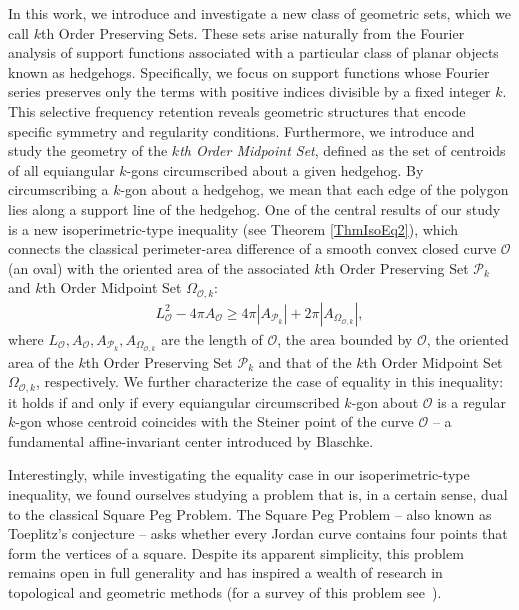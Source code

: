 \documentclass{amsart}
\theoremstyle{definition}
\numberwithin{equation}{section}
\begin{document}
In this work, we introduce and investigate a new class of geometric sets, which we call $k$th Order Preserving Sets. These sets arise naturally from the Fourier analysis of support functions associated with a particular class of planar objects known as hedgehogs. Specifically, we focus on support functions whose Fourier series preserves only the terms with positive indices divisible by a fixed integer $k$. This selective frequency retention reveals geometric structures that encode specific symmetry and regularity conditions. Furthermore, we introduce and study the geometry of the \textit{$k$th Order Midpoint Set}, defined as the set of centroids of all equiangular $k$-gons circumscribed about a given hedgehog. By circumscribing a $k$-gon about a hedgehog, we mean that each edge of the polygon lies along a support line of the hedgehog.
One of the central results of our study is a new isoperimetric-type inequality (see Theorem \ref{ThmIsoEq2}), which connects the classical perimeter-area difference of a smooth convex closed curve $\mathcal{O}$ (an oval) with the oriented area of the associated $k$th Order Preserving Set $\mathcal{P}_k$ and $k$th Order Midpoint Set $\Omega_{\mathcal{O},k}$:
\begin{align*}
L_{\mathcal{O}}^2 - 4\pi A_{\mathcal{O}} \geqslant  4\pi |A_{\mathcal{P}_k}| + 2\pi |A_{\Omega_{\mathcal{O},k}}|,
\end{align*}
where $L_{\mathcal{O}}, A_{\mathcal{O}}, A_{\mathcal{P}_k}, A_{\Omega_{\mathcal{O},k}}$ are the length of $\mathcal{O}$, the area bounded by $\mathcal{O}$, the oriented area of the $k$th Order Preserving Set $\mathcal{P}_k$ and that of the $k$th Order Midpoint Set $\Omega_{\mathcal{O},k}$, respectively. We further characterize the case of equality in this inequality: it holds if and only if every equiangular circumscribed $k$-gon about $\mathcal{O}$ is a regular \linebreak $k$-gon whose centroid coincides with the Steiner point of the curve $\mathcal{O}$ -- a fundamental affine-invariant center introduced by Blaschke.

Interestingly, while investigating the equality case in our isoperimetric-type inequality, we found ourselves studying a problem that is, in a certain sense, dual to the classical Square Peg Problem. The Square Peg Problem -- also known as Toeplitz’s conjecture -- asks whether every Jordan curve contains four points that form the vertices of a square. Despite its apparent simplicity, this problem remains open in full generality and has inspired a wealth of research in topological and geometric methods (for a survey of this problem see~\cite{PegSurvey}).
\end{document}
